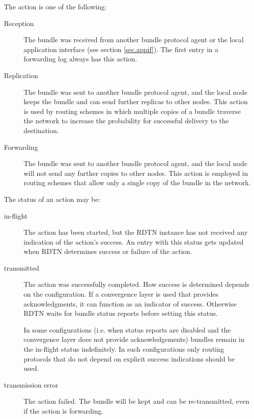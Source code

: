 \documentclass[a4paper]{article}
\begin{document}
The action is one of the following:
\begin{description}

\item[Reception] The bundle was received from another bundle protocol agent or
the local application interface (see section \ref{sec.appif}). 
The first entry in a forwarding log always has this action.

\item[Replication] The bundle was sent to another bundle protocol agent, and the
local node keeps the bundle and can send further replicas to other nodes. This
action is used by routing schemes in which multiple copies of a bundle traverse
the network to increase the probability for successful delivery to the
destination.

\item[Forwarding] The bundle was sent to another bundle protocol agent, and the
local node will not send any further copies to other nodes. This action is
employed in routing schemes that allow only a single copy of the bundle in the
network.

\end{description}

The status of an action may be:
\begin{description}

\item[in-flight] The action has been started, but the RDTN instance has not
received any indication of the action's success. An entry with this status gets
updated when RDTN determines success or failure of the action.

\item[transmitted] The action was successfully completed. How success is
determined depends on the configuration. If a convergence layer is used that
provides acknowledgments, it can function as an indicator of success. Otherwise
RDTN waits for bundle status reports before setting this status.

In some configurations (i.e. when status reports are disabled and the
convergence layer does not provide acknowledgements) bundles remain in the
in-flight status indefinitely. In such configurations only routing protocols
that do not depend on explicit success indications should be used.

\item[transmission error] The action failed. The bundle will be kept and can be
re-transmitted, even if the action is forwarding.

\end{description}
\end{document}
